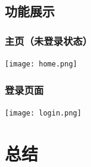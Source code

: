 \documentclass[12pt]{article}
\begin{document}
\subsection{功能展示}

\subsubsection{主页（未登录状态）}

\begin{center}
	\texttt{[image: home.png]}
\end{center}

\subsubsection{登录页面}

\begin{center}
	\texttt{[image: login.png]}
\end{center}

\section{总结}
\end{document}
